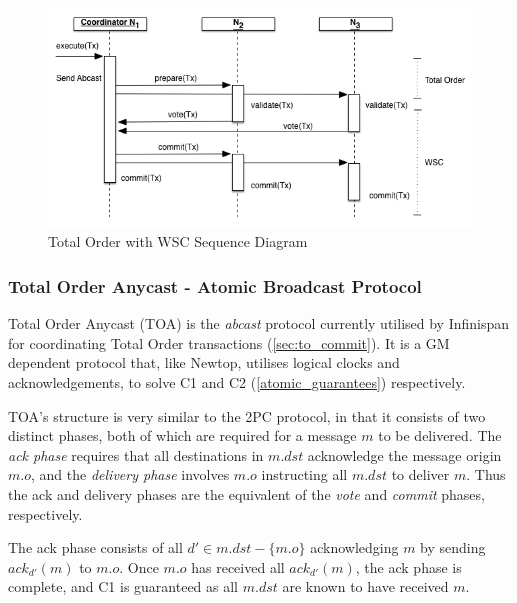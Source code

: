 	        \begin{figure}[htbp!] 
                \centering    
                \includegraphics[width=1.0\textwidth]{WSC-Abcast}
                \caption[Total Order Commit with Write Skew Check]{Total Order with WSC Sequence Diagram}
                \label{fig:total_order_wsc}
            \end{figure}	      	
                        
	        \subsubsection{Total Order Anycast - Atomic Broadcast Protocol} \label{ssec:TOA_limations}
	        Total Order Anycast (TOA)\cite{Ruivo:2011:ETO:2120967.2121604} is the \emph{abcast} protocol currently utilised by Infinispan for coordinating Total Order transactions (\ref{sec:to_commit}).  It is a GM dependent protocol that, like Newtop\citep{Ezhilchelvan:1995:NFG:876885.880005}, utilises logical clocks and acknowledgements, to solve C1 and C2 (\ref{atomic_guarantees}) respectively.  
	        
			TOA's structure is very similar to the 2PC protocol, in that it consists of two distinct phases, both of which are required for a message $m$ to be delivered.  The \emph{ack phase} requires that all destinations in $m.dst$ acknowledge the message origin $m.o$, and the \emph{delivery phase} involves $m.o$ instructing all $m.dst$ to deliver $m$.  Thus the ack and delivery phases are the equivalent of the \emph{vote} and \emph{commit} phases, respectively.  
	        
			The ack phase consists of all $d' \in m.dst-\{m.o\}$ acknowledging $m$ by sending $ack_{d'}(m)$ to $m.o$.  Once $m.o$ has received all $ack_{d'}(m)$, the ack phase is complete, and C1 is guaranteed as all $m.dst$ are known to have received $m$.  
			
